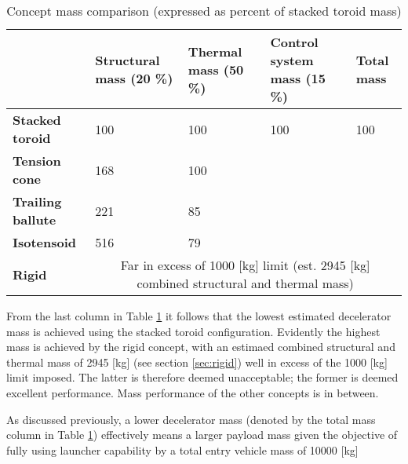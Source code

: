 \begin{table}[h]
\caption{Concept mass comparison (expressed as percent of stacked toroid mass)}\label{tab:cmass}
\hspace{-10mm}
\begin{tabular}{|p{}|p{}|p{}|p{}||p{}|}
\hline
                          & \textbf{Structural mass (20 \%)} & \textbf{Thermal mass (50 \%)} & \textbf{Control system mass (15 \%)} & \textbf{Total mass} \\ \hline
\textbf{Stacked toroid}   &  100                                 & 100                          & 100                                      &\cellcolor{green!70}  100                           \\ \hline
\textbf{Tension cone}     &  168                               & 100                               &                                       &\cellcolor{green!70}                                \\ \hline
\textbf{Trailing ballute} &  221                                 & 85                               &                                       &\cellcolor{green!70}                                \\ \hline
\textbf{Isotensoid}       &  516                                 & 79                               &                                       &\cellcolor{yellow!75}                             \\ \hline \hline
\textbf{Rigid}            &  \multicolumn{4}{|c|}{\cellcolor{red!60} Far in excess of 1000 [kg] limit (est. 2945 [kg] combined structural and thermal mass)}    \\ \hline
\end{tabular}
\end{table}

From the last column in Table \ref{tab:cmass} it follows that the lowest estimated decelerator mass is achieved using the stacked toroid configuration. Evidently the highest mass is achieved by the rigid concept, with an estimaed combined structural and thermal mass of 2945 [kg] (see section \ref{sec:rigid}) well in excess of the 1000 [kg] limit imposed. The latter is therefore deemed unacceptable; the former is deemed excellent performance. Mass performance of the other concepts is in between. 

As discussed previously, a lower decelerator mass (denoted by the total mass column in Table \ref{tab:cmass}) effectively means a larger payload mass given the objective of fully using launcher capability by a total entry vehicle mass of 10000 [kg]

